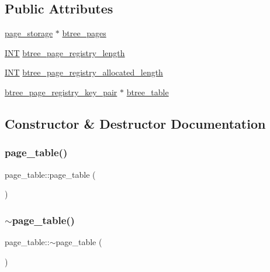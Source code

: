 \subsection*{Public Attributes}
\begin{DoxyCompactItemize}
\item 
\mbox{\hyperlink{classpage__storage}{page\+\_\+storage}} $\ast$ \mbox{\hyperlink{classpage__table_a5dac3496822726daf67f5230c1f96390}{btree\+\_\+pages}}
\item 
\mbox{\hyperlink{galois_8h_a09fddde158a3a20bd2dcadb609de11dc}{I\+NT}} \mbox{\hyperlink{classpage__table_a75c9a6c8d93ee9551c5d37f2a65bd9b0}{btree\+\_\+page\+\_\+registry\+\_\+length}}
\item 
\mbox{\hyperlink{galois_8h_a09fddde158a3a20bd2dcadb609de11dc}{I\+NT}} \mbox{\hyperlink{classpage__table_aa0857ba1382a46b2628ba9f1ec216920}{btree\+\_\+page\+\_\+registry\+\_\+allocated\+\_\+length}}
\item 
\mbox{\hyperlink{structbtree__page__registry__key__pair}{btree\+\_\+page\+\_\+registry\+\_\+key\+\_\+pair}} $\ast$ \mbox{\hyperlink{classpage__table_a00345ca4f7fa36673a5a839d186c6861}{btree\+\_\+table}}
\end{DoxyCompactItemize}


\subsection{Constructor \& Destructor Documentation}
\mbox{\label{classpage__table_ab2abc07d84f8c5049365e613b5ecbd6f}} 
\subsubsection{\texorpdfstring{page\+\_\+table()}{page\_table()}}
{\footnotesize\ttfamily page\+\_\+table\+::page\+\_\+table (\begin{DoxyParamCaption}{ }\end{DoxyParamCaption})}

\mbox{\label{classpage__table_a0ebbe83b48bf125b309e41c92cb09850}} 
\subsubsection{\texorpdfstring{$\sim$page\+\_\+table()}{~page\_table()}}
{\footnotesize\ttfamily page\+\_\+table\+::$\sim$page\+\_\+table (\begin{DoxyParamCaption}{ }\end{DoxyParamCaption})}



